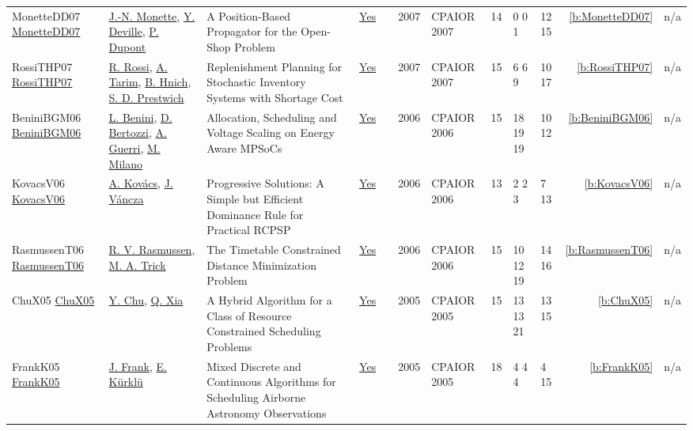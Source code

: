 {\begin{longtable}{>{\raggedright\arraybackslash}p{3cm}>{\raggedright\arraybackslash}p{4.5cm}>{\raggedright\arraybackslash}p{6.0cm}rrrp{2.5cm}rp{1cm}p{1cm}rr}
MonetteDD07 \href{https://doi.org/10.1007/978-3-540-72397-4_14}{MonetteDD07} & \hyperref[auth:a149]{J.-N. Monette}, \hyperref[auth:a151]{Y. Deville}, \hyperref[auth:a368]{P. Dupont} & \cellcolor{green!10}A Position-Based Propagator for the Open-Shop Problem & \href{../works/MonetteDD07.pdf}{Yes} & \cite{MonetteDD07} & 2007 & CPAIOR 2007 & 14 & 0 0 1 & 12 15 & \ref{b:MonetteDD07} & n/a\\
RossiTHP07 \href{https://doi.org/10.1007/978-3-540-72397-4_17}{RossiTHP07} & \hyperref[auth:a369]{R. Rossi}, \hyperref[auth:a370]{A. Tarim}, \hyperref[auth:a137]{B. Hnich}, \hyperref[auth:a371]{S. D. Prestwich} & \cellcolor{green!10}Replenishment Planning for Stochastic Inventory Systems with Shortage Cost & \href{../works/RossiTHP07.pdf}{Yes} & \cite{RossiTHP07} & 2007 & CPAIOR 2007 & 15 & 6 6 9 & 10 17 & \ref{b:RossiTHP07} & n/a\\
BeniniBGM06 \href{https://doi.org/10.1007/11757375_6}{BeniniBGM06} & \hyperref[auth:a245]{L. Benini}, \hyperref[auth:a375]{D. Bertozzi}, \hyperref[auth:a376]{A. Guerri}, \hyperref[auth:a143]{M. Milano} & \cellcolor{green!10}Allocation, Scheduling and Voltage Scaling on Energy Aware MPSoCs & \href{../works/BeniniBGM06.pdf}{Yes} & \cite{BeniniBGM06} & 2006 & CPAIOR 2006 & 15 & 18 19 19 & 10 12 & \ref{b:BeniniBGM06} & n/a\\
KovacsV06 \href{https://doi.org/10.1007/11757375_13}{KovacsV06} & \hyperref[auth:a146]{A. Kov{\'{a}}cs}, \hyperref[auth:a278]{J. V{\'{a}}ncza} & \cellcolor{green!10}Progressive Solutions: {A} Simple but Efficient Dominance Rule for Practical {RCPSP} & \href{../works/KovacsV06.pdf}{Yes} & \cite{KovacsV06} & 2006 & CPAIOR 2006 & 13 & 2 2 3 & 7 13 & \ref{b:KovacsV06} & n/a\\
RasmussenT06 \href{https://doi.org/10.1007/11757375_15}{RasmussenT06} & \hyperref[auth:a1404]{R. V. Rasmussen}, \hyperref[auth:a1390]{M. A. Trick} & The Timetable Constrained Distance Minimization Problem & \href{../works/RasmussenT06.pdf}{Yes} & \cite{RasmussenT06} & 2006 & CPAIOR 2006 & 15 & 10 12 19 & 14 16 & \ref{b:RasmussenT06} & n/a\\
ChuX05 \href{https://doi.org/10.1007/11493853_10}{ChuX05} & \hyperref[auth:a377]{Y. Chu}, \hyperref[auth:a378]{Q. Xia} & A Hybrid Algorithm for a Class of Resource Constrained Scheduling Problems & \href{../works/ChuX05.pdf}{Yes} & \cite{ChuX05} & 2005 & CPAIOR 2005 & 15 & 13 13 21 & 13 15 & \ref{b:ChuX05} & n/a\\
FrankK05 \href{https://doi.org/10.1007/11493853_15}{FrankK05} & \hyperref[auth:a379]{J. Frank}, \hyperref[auth:a380]{E. K{\"{u}}rkl{\"{u}}} & Mixed Discrete and Continuous Algorithms for Scheduling Airborne Astronomy Observations & \href{../works/FrankK05.pdf}{Yes} & \cite{FrankK05} & 2005 & CPAIOR 2005 & 18 & 4 4 4 & 4 15 & \ref{b:FrankK05} & n/a\\

\end{longtable}}
